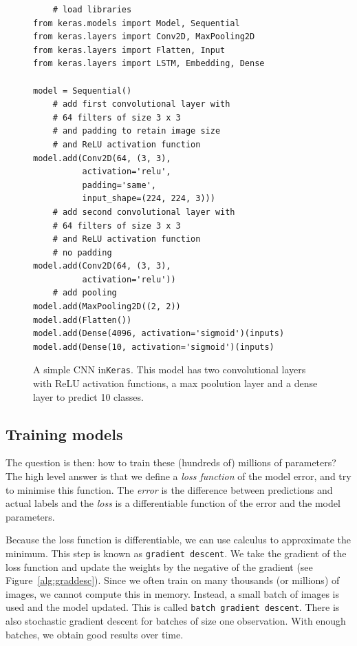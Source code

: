 \documentclass[12pt, a4paper, oneside, headinclude, footinclude]{article}
\begin{document}
\begin{figure}
\begin{verbatim}
    # load libraries
from keras.models import Model, Sequential
from keras.layers import Conv2D, MaxPooling2D
from keras.layers import Flatten, Input
from keras.layers import LSTM, Embedding, Dense

model = Sequential()
    # add first convolutional layer with 
    # 64 filters of size 3 x 3
    # and padding to retain image size
    # and ReLU activation function
model.add(Conv2D(64, (3, 3), 
          activation='relu', 
          padding='same', 
          input_shape=(224, 224, 3)))
    # add second convolutional layer with 
    # 64 filters of size 3 x 3
    # and ReLU activation function
    # no padding
model.add(Conv2D(64, (3, 3), 
          activation='relu'))
    # add pooling
model.add(MaxPooling2D((2, 2))
model.add(Flatten())
model.add(Dense(4096, activation='sigmoid')(inputs)
model.add(Dense(10, activation='sigmoid')(inputs)

\end{verbatim}
    \caption[A simple CNN in\texttt{Keras}]{A simple CNN in\texttt{Keras}. This model
    has two convolutional layers with ReLU activation functions, a max
    poolution layer and a dense layer to predict 10
    classes.\label{alg:simple_CNN}}
\end{figure}
\subsection{Training models}

The question is then: how to train these (hundreds of) millions of parameters?
The high level answer is that we define a \textit{loss function} of the model
error, and try to minimise this function.  The \textit{error} is the
difference between predictions and actual labels and the \textit{loss} is a
differentiable function of the error and the model parameters.

Because the loss function is differentiable, we can use calculus to
approximate the minimum. This step is known as \texttt{gradient descent}.  We
take the gradient of the loss function and update the weights by the negative
of the gradient (see Figure~\ref{alg:graddesc}).  Since we often train on many
thousands (or millions) of images, we cannot compute this in memory. Instead, a
small batch of images is used and the model updated.  This is called
\texttt{batch gradient descent}. There is also stochastic gradient descent for
batches of size one observation. With enough batches, we obtain good results
over time.
\end{document}
